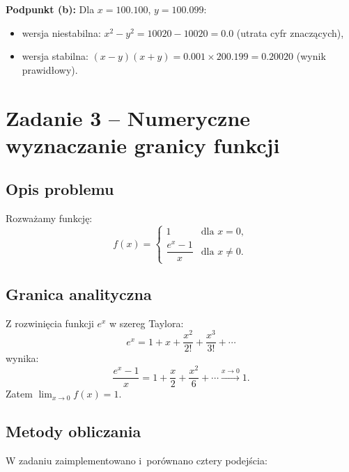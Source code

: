 \documentclass[12pt, a4paper]{article}
\begin{document}
\textbf{Podpunkt (b):} Dla $x = 100.100$, $y = 100.099$:
\begin{itemize}
  \item wersja niestabilna: $x^2 - y^2 =  10020 - 10020  = 0.0$ (utrata cyfr znaczących),
  \item wersja stabilna: $(x-y)(x+y) = 0.001 \times 200.199 = 0.20020$ (wynik prawidłowy).
\end{itemize}

\section{Zadanie 3 -- Numeryczne wyznaczanie granicy funkcji}

\subsection{Opis problemu}

Rozważamy funkcję:
\begin{equation}
  f(x) =
  \begin{cases}
    1 & \text{dla } x = 0, \\
    \dfrac{e^x - 1}{x} & \text{dla } x \neq 0.
  \end{cases}
  \label{eq:f3}
\end{equation}

\subsection{Granica analityczna}

Z rozwinięcia funkcji $e^x$ w szereg Taylora:
\begin{equation}
  e^x = 1 + x + \frac{x^2}{2!} + \frac{x^3}{3!} + \cdots
\end{equation}
wynika:
\begin{equation}
  \frac{e^x - 1}{x} = 1 + \frac{x}{2} + \frac{x^2}{6} + \cdots \xrightarrow{x \to 0} 1.
\end{equation}
Zatem $\lim_{x \to 0} f(x) = 1$.

\subsection{Metody obliczania}

W zadaniu zaimplementowano i~porównano cztery podejścia:
\end{document}
